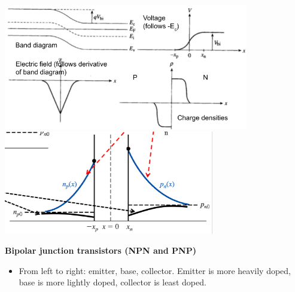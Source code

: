 \documentclass{article}
\begin{document}
\begin{center}
    \includegraphics[align=c, height=5.5cm]{pngraphs.png}
    \includegraphics[align=c, height=4.5cm]{pncarriers.png}
\end{center}
\textbf{Bipolar junction transistors (NPN and PNP)}
\begin{itemize}
    \item From left to right: emitter, base, collector. Emitter is more heavily doped, base is more lightly doped, collector is least doped.
\end{itemize}
\end{document}
